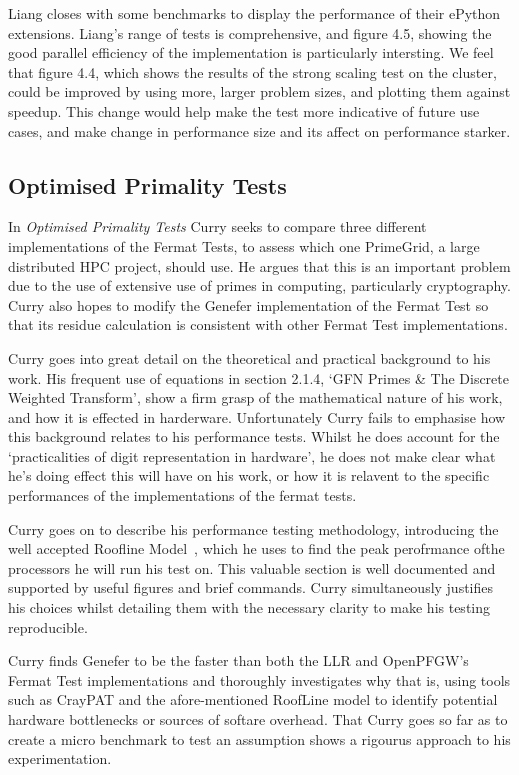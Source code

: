 \documentclass{article}[a4]
\begin{document}
 Liang closes with some benchmarks to display the performance of their ePython extensions. Liang's range of tests is comprehensive, and figure 4.5, showing the good parallel efficiency of the implementation is particularly intersting. We feel that figure 4.4, which shows the results of the strong scaling test on the cluster, could be improved by using more, larger problem sizes, and plotting them against speedup. This change would help make the test more indicative of future use cases, and make change in performance size and its affect on performance starker.

\subsection{Optimised Primality Tests}

In \textit{Optimised Primality Tests} Curry seeks to compare three different implementations of the Fermat Tests, to assess which one PrimeGrid, a large distributed HPC project, should use. He argues that this is an important problem due to the use of extensive use of primes in computing, particularly cryptography. Curry also hopes to modify the Genefer implementation of the Fermat Test so that its residue calculation is consistent with other Fermat Test implementations.

Curry goes into great detail on the theoretical and practical background to his work. His frequent use of equations in section 2.1.4, `GFN Primes \& The Discrete Weighted Transform', show a firm grasp of the mathematical nature of his work, and how it is effected in harderware. Unfortunately Curry fails to emphasise how this background relates to his performance tests.  Whilst he does account for the `practicalities of digit representation in hardware', he does not make clear what he's doing effect this will have on his work, or how it is relavent to the specific performances of the implementations of the fermat tests.

Curry goes on to describe his performance testing  methodology, introducing the well accepted Roofline Model~\cite{williams2009}\cite{hennessy2011computer}\cite{asanovic2009view}, which he uses to find the peak perofrmance ofthe processors he will run his test on. This valuable section is well documented and supported by useful figures and brief commands. Curry simultaneously justifies his choices whilst detailing them with the necessary clarity to make his testing reproducible.

Curry finds Genefer to be the faster than both the LLR and OpenPFGW's Fermat Test implementations and thoroughly investigates why that is, using tools such as CrayPAT and the afore-mentioned RoofLine model to identify potential hardware bottlenecks or sources of softare overhead. That Curry goes so far as to create a micro benchmark to test an assumption shows a rigourus approach to his experimentation.
\end{document}
